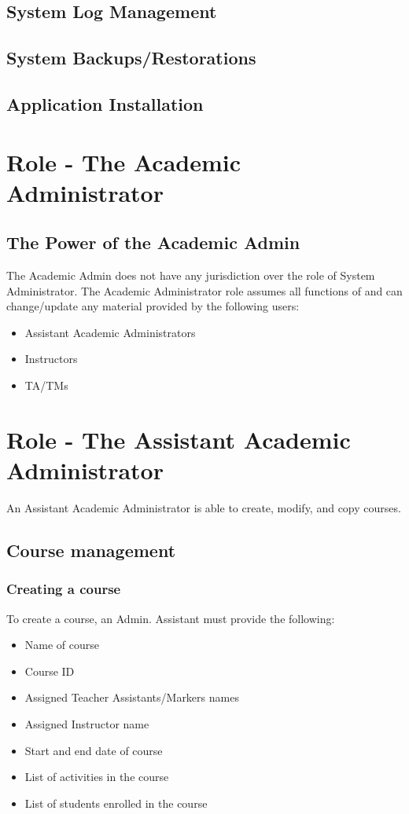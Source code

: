 \documentclass{article}
\begin{document}
\subsection{System Log Management}
\subsection{System Backups/Restorations}
\subsection{Application Installation}

\section{Role - The Academic Administrator}
\subsection{The Power of the Academic Admin}
The Academic Admin does not have any jurisdiction over the role of System Administrator.
The Academic Administrator role assumes all functions of and can change/update any material
provided by the following users:
\begin{itemize}
  \item Assistant Academic Administrators
  \item Instructors
  \item TA/TMs
\end{itemize}

\section{Role - The Assistant Academic Administrator}
An Assistant Academic Administrator is able to create, modify, and copy courses.
\subsection {Course management}
\subsubsection{Creating a course}
To create a course, an Admin. Assistant must provide the following:
\begin{itemize}
	\item Name of course
	\item Course ID
	\item Assigned Teacher Assistants/Markers names
	\item Assigned Instructor name
	\item Start and end date of course
	\item List of activities in the course
	\item List of students enrolled in the course
\end{itemize}
\end{document}
